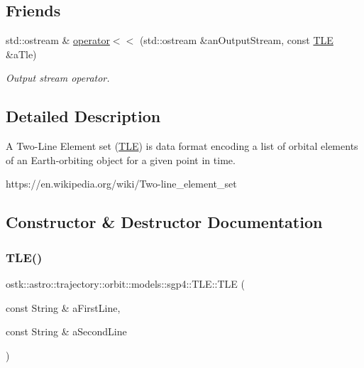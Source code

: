 \subsection*{Friends}
\begin{DoxyCompactItemize}
\item 
std\+::ostream \& \hyperlink{classostk_1_1astro_1_1trajectory_1_1orbit_1_1models_1_1sgp4_1_1_t_l_e_a54a7a3bca65674d5052031634f900984}{operator$<$$<$} (std\+::ostream \&an\+Output\+Stream, const \hyperlink{classostk_1_1astro_1_1trajectory_1_1orbit_1_1models_1_1sgp4_1_1_t_l_e}{T\+LE} \&a\+Tle)
\begin{DoxyCompactList}\small\item\em Output stream operator. \end{DoxyCompactList}\end{DoxyCompactItemize}


\subsection{Detailed Description}
A Two-\/\+Line Element set (\hyperlink{classostk_1_1astro_1_1trajectory_1_1orbit_1_1models_1_1sgp4_1_1_t_l_e}{T\+LE}) is data format encoding a list of orbital elements of an Earth-\/orbiting object for a given point in time. 

https\+://en.wikipedia.\+org/wiki/\+Two-\/line\+\_\+element\+\_\+set 

\subsection{Constructor \& Destructor Documentation}
\mbox{\label{classostk_1_1astro_1_1trajectory_1_1orbit_1_1models_1_1sgp4_1_1_t_l_e_a57323db2c24577c2e8ddce79fa776d1e}} 
\subsubsection{\texorpdfstring{T\+L\+E()}{TLE()}\hspace{0.1cm}{\footnotesize\ttfamily [1/2]}}
{\footnotesize\ttfamily ostk\+::astro\+::trajectory\+::orbit\+::models\+::sgp4\+::\+T\+L\+E\+::\+T\+LE (\begin{DoxyParamCaption}\item[{const String \&}]{a\+First\+Line,  }\item[{const String \&}]{a\+Second\+Line }\end{DoxyParamCaption})}



